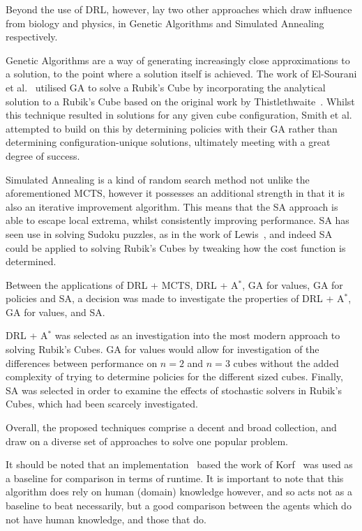 \documentclass[UKenglish]{svproc}
\begin{document}
Beyond the use of DRL, however, lay two other approaches which draw influence from biology and physics, in Genetic Algorithms and Simulated Annealing respectively.

Genetic Algorithms are a way of generating increasingly close approximations to a solution, to the point where a solution itself is achieved. The work of El-Sourani et al.~\cite{10.1007/978-3-642-12239-2_9} utilised GA to solve a Rubik's Cube by incorporating the analytical solution to a Rubik's Cube based on the original work by Thistlethwaite~\cite{Thistlethwaite}. Whilst this technique resulted in solutions for any given cube configuration, Smith et al.~\cite{10.1145/2908812.2908887} attempted to build on this by determining policies with their GA rather than determining configuration-unique solutions, ultimately meeting with a great degree of success.

Simulated Annealing is a kind of random search method not unlike the aforementioned MCTS, however it possesses an additional strength in that it is also an iterative improvement algorithm. This means that the SA approach is able to escape local extrema, whilst consistently improving performance. SA has seen use in solving Sudoku puzzles, as in the work of Lewis~\cite{SAarticle}, and indeed SA could be applied to solving Rubik's Cubes by tweaking how the cost function is determined.

Between the applications of DRL + MCTS, DRL + A$^{\ast}$, GA for values, GA for policies and SA, a decision was made to investigate the properties of DRL + A$^{\ast}$, GA for values, and SA.

DRL + A$^{\ast}$ was selected as an investigation into the most modern approach to solving Rubik's Cubes. GA for values would allow for investigation of the differences between performance on $n=2$ and $n=3$ cubes without the added complexity of trying to determine policies for the different sized cubes. Finally, SA was selected in order to examine the effects of stochastic solvers in Rubik's Cubes, which had been scarcely investigated.

Overall, the proposed techniques comprise a decent and broad collection, and draw on a diverse set of approaches to solve one popular problem.

It should be noted that an implementation~\cite{Shoukat2019} based the work of Korf~\cite{KORF198597} was used as a baseline for comparison in terms of runtime. It is important to note that this algorithm does rely on human (domain) knowledge however, and so acts not as a baseline to beat necessarily, but a good comparison between the agents which do not have human knowledge, and those that do.
\end{document}
